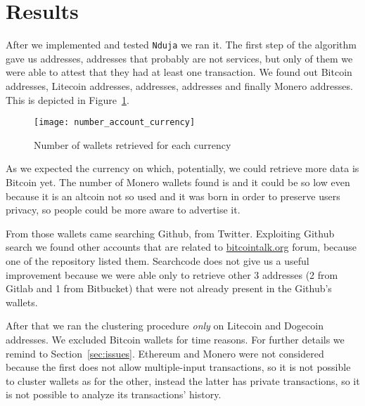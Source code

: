 \newcommand{\accountGitlab}{2}

\newcommand{\accountBitbucket}{1}


\section{Results} \label{results}
After we implemented and tested \texttt{Nduja} we ran it. The first step of the
algorithm gave us \startingNumberAllWallets{} addresses,
\startingNumberWalletsNotService{} addresses that probably are not services,
but only \startingNumberWalletsAtLeastOneTransaction{} of them we were able to
attest that they had at least one transaction. We found out \startingBTC{}
Bitcoin addresses, \startingLTC{} Litecoin addresses, \startingDOGE{}
addresses, \startingETH{} addresses and finally \startingXMR{} Monero
addresses. This is depicted in Figure~\ref{fig:numberaccountcurrency}.
\begin{figure}[H]
\centering
\texttt{[image: number\_account\_currency]}
\caption{Number of wallets retrieved for each currency}
\label{fig:numberaccountcurrency}
\end{figure}

As we expected the currency on which, potentially, we could retrieve more data
is Bitcoin yet. The number of Monero wallets found is \startingXMR{} and it
could be so low even because it is an altcoin not so used and it was born in
order to preserve users privacy, so people could be more aware to advertise it.

From those wallets \accountGithub{} came searching Github, \accountTwitter{}
from Twitter. Exploiting Github search we found other \accountBitcointalk{}
accounts that are related to \url{bitcointalk.org} forum, because one of the
repository listed them. Searchcode does not give us a useful improvement
because we were able only to retrieve other 3 addresses (\accountGitlab{} from
Gitlab and \accountBitbucket{} from Bitbucket) that were not already present in
the Github's wallets. 

After that we ran the clustering procedure \emph{only} on Litecoin and Dogecoin
addresses. We excluded Bitcoin wallets for time reasons. For further details we
remind to Section~\ref{sec:issues}. Ethereum and Monero were not considered
because the first does not allow multiple-input transactions, so it is not
possible to cluster wallets as for the other, instead the latter has private
transactions, so it is not possible to analyze its transactions' history. 

